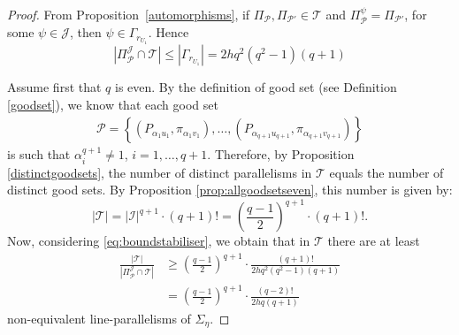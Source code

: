 \documentclass[10pt,a4paper]{amsart}
\def\cI{\mathcal I}
\def\cJ{\mathcal J}
\def\cP{\mathcal P}
\def\cT{\mathcal T}
\begin{document}
\begin{proof}
From Proposition~\ref{automorphisms}, if $\Pi_{\cP}, \Pi_{\cP'} \in \cT$ and $\Pi_{\cP}^\psi = \Pi_{\cP'}$, for some $\psi \in \cJ$, then $\psi \in \Gamma_{r_{U_1}}$. Hence
\begin{equation} \label{eq:boundstabiliser}
|\Pi_{\cP}^{\cJ} \cap \cT| \le |\Gamma_{r_{U_1}}| = 2hq^2(q^2-1)(q+1)
\end{equation}

Assume first that $q$ is even. By the definition of good set (see Definition \ref{goodset}), we know that each good set
\begin{align*}
\cP = \left\{\left(P_{\alpha_{1} u_1}, \pi_{\alpha_{1} v_1}\right), \dots, \left(P_{\alpha_{q+1} u_{q+1}}, \pi_{\alpha_{q+1} v_{q+1}}\right)\right\}
\end{align*}
is such that $\alpha_i^{q+1} \neq 1$, $i = 1, \dots, q+1$. Therefore, by Proposition \ref{distinctgoodsets}, the number of distinct parallelisms in $\cT$ equals the number of distinct good sets. By Proposition \ref{prop:allgoodsetseven}, this number is given by:
\[
|\cT| = |\cI|^{q+1} \cdot (q+1)! = \left( \frac{q-1}{2} \right)^{q+1} \cdot (q+1)!.
\]
Now, considering \eqref{eq:boundstabiliser}, we obtain that in $\cT$ there are at least
\[
\begin{array}{rl}
\displaystyle \frac{|\cT|}{|\Pi_{\cP}^{\cJ} \cap \cT|} &\displaystyle \ge \left( \frac{q-1}{2} \right)^{q+1} \cdot \frac{(q+1)!}{2hq^2(q^2 - 1)(q+1)} \\[10pt]
&\displaystyle = \left( \frac{q-1}{2} \right)^{q+1} \cdot \frac{(q-2)!}{2hq(q + 1)}
\end{array}
\]
non-equivalent line-parallelisms of $\Sigma_{\eta}$.



\end{proof}
\end{document}
